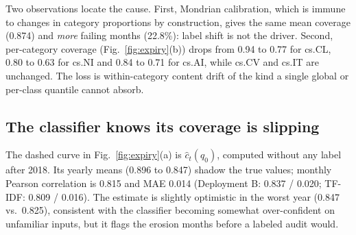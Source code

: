 \documentclass[conference]{IEEEtran}
\newcommand{\chat}{\hat{c}}
\begin{document}
Two observations locate the cause. First, Mondrian calibration, which is immune to changes in category proportions by construction, gives the same mean coverage (0.874) and \emph{more} failing months (22.8\%): label shift is not the driver. Second, per-category coverage (Fig.~\ref{fig:expiry}(b)) drops from 0.94 to 0.77 for cs.CL, 0.80 to 0.63 for cs.NI and 0.84 to 0.71 for cs.AI, while cs.CV and cs.IT are unchanged. The loss is within-category content drift of the kind a single global or per-class quantile cannot absorb.

\subsection{The classifier knows its coverage is slipping}\label{sec:estimator}
The dashed curve in Fig.~\ref{fig:expiry}(a) is $\chat_t(q_0)$, computed without any label after 2018. Its yearly means (0.896 to 0.847) shadow the true values; monthly Pearson correlation is 0.815 and MAE 0.014 (Deployment B: 0.837 / 0.020; TF-IDF: 0.809 / 0.016). The estimate is slightly optimistic in the worst year (0.847 vs.\ 0.825), consistent with the classifier becoming somewhat over-confident on unfamiliar inputs, but it flags the erosion months before a labeled audit would.
\end{document}
